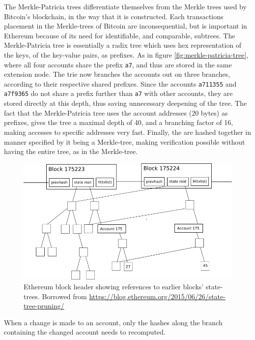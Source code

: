 \documentclass{article}
\begin{document}
			The Merkle-Patricia trees differentiate themselves from the Merkle trees used by Bitcoin's blockchain, in the way that it is constructed.
			Each transactions placement in the Merkle-trees of Bitcoin are inconsequential, but is important in Ethereum because of its need for identifiable, and comparable, subtrees.
			The Merkle-Patricia tree is essentially a radix tree which uses hex representation of the keys, of the key-value pairs, as prefixes.
			As in figure \ref{fig:merkle-patricia-tree}, where all four accounts share the prefix \texttt{a7}, and thus are stored in the same extension node.
			The trie now branches the accounts out on three branches, according to their respective shared prefixes. 
			Since the accounts \texttt{a711355} and \texttt{a7f9365} do not share a prefix further than \texttt{a7} with other accounts, they are stored directly at this depth, thus saving unnecessary deepening of the tree.
			The fact that the Merkle-Patricia tree uses the account addresses (20 bytes) as prefixes, gives the tree a maximal depth of 40, and a branching factor of 16, making accesses to specific addresses very fast.  
			Finally, the are hashed together in manner specified by it being a Merkle-tree, making verification possible without having the entire tree, as in the Merkle-tree.  

			\begin{figure}[!ht]
				\centering
				\includegraphics[scale=0.4]{figures/merkle-backref.png}
			 	\caption[Ethereum block header showing references to earlier blocks]
			 	{Ethereum block header showing references to earlier blocks' state-trees. Borrowed from \url{https://blog.ethereum.org/2015/06/26/state-tree-pruning/}}
			 	\label{fig:merkle-patricia-tree-references}
			\end{figure}

			When a change is made to an account, only the hashes along the branch containing the changed account needs to recomputed.
\end{document}
